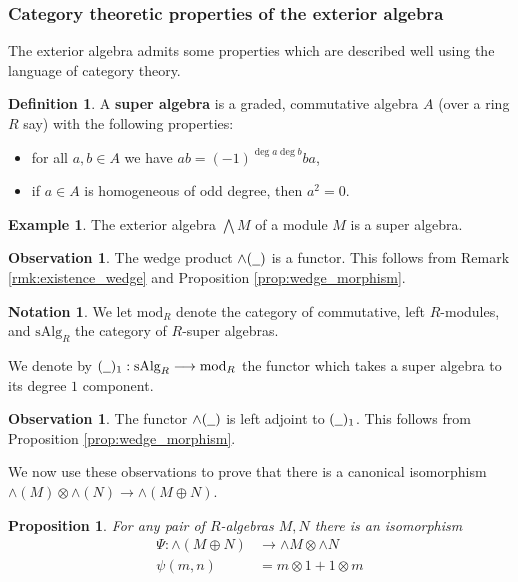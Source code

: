 \documentclass[12pt]{article}
\theoremstyle{plain}
\newtheorem{proposition}[thm]{Proposition}
\theoremstyle{definition}
\newtheorem{defn}[thm]{Definition} %
\newtheorem{notation}[thm]{Notation}
\newtheorem{example}[thm]{Example}
\newtheorem{observation}[thm]{Observation}
\newcommand{\und}[1]{\underline{\hspace{#1 cm}}}
\newcommand{\lto}{\longrightarrow}
\begin{document}
	\subsubsection{Category theoretic properties of the exterior algebra}
	The exterior algebra admits some properties which are described well using the language of category theory.
	\begin{defn}
		A \textbf{super algebra} is a graded, commutative algebra $A$ (over a ring $R$ say) with the following properties:
		\begin{itemize}
			\item for all $a,b \in A$ we have $ab = (-1)^{\operatorname{deg}a\operatorname{deg}b}ba$,
			\item if $a \in A$ is homogeneous of odd degree, then $a^2 = 0$.
		\end{itemize}
	\end{defn}
	\begin{example}
		The exterior algebra $\bigwedge M$ of a module $M$ is a super algebra.
	\end{example}
	\begin{observation}
		The wedge product $\wedge(\und{0.2})$ is a functor. This follows from Remark \ref{rmk:existence_wedge} and Proposition \ref{prop:wedge_morphism}.
	\end{observation}
	\begin{notation}
		We let $\text{mod}_R$ denote the category of commutative, left $R$-modules, and $\text{sAlg}_R$ the category of $R$-super algebras.
		
		We denote by $(\und{0.2})_1: \text{sAlg}_R \lto \text{mod}_R$ the functor which takes a super algebra to its degree $1$ component.
	\end{notation}
	\begin{observation}\label{obs:wedge_adjunction}
		The functor $\wedge(\und{0.2})$ is left adjoint to $(\und{0.2})_1$. This follows from Proposition \ref{prop:wedge_morphism}.
	\end{observation}
	We now use these observations to prove that there is a canonical isomorphism $\wedge(M) \otimes \wedge(N) \lto \wedge(M \oplus N)$.
	\begin{proposition}\label{prop:sum_tensor_wedge}
		For any pair of $R$-algebras $M,N$ there is an isomorphism
		\begin{align*}
			\Psi: \wedge ( M \oplus N ) &\lto \wedge M \otimes \wedge N\\
			\psi(m, n) &= m \otimes 1 + 1 \otimes m
		\end{align*}
	\end{proposition}
\end{document}
